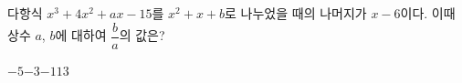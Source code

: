 다항식 $x^3+4x^2+ax-15$를 $x^2+x+b$로 나누었을 때의 나머지가 $x-6$이다. 이때 상수 $a$, $b$에 대하여 $\dfrac{b}{a}$의 값은?
\begin{choices32}{$-5$}{$-3$}{$-1$}{$1$}{$3$}\end{choices32}
